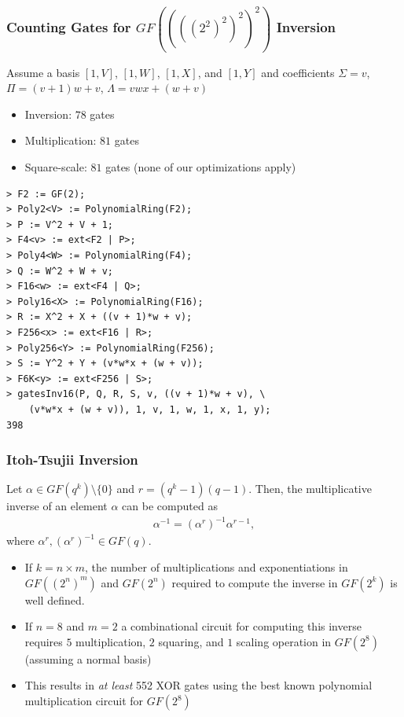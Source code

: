 \documentclass[handout,10pt]{beamer}
\begin{document}
\begin{frame}[fragile]
	\frametitle{Counting Gates for $GF((((2^2)^2)^2)^2)$ Inversion}
	Assume a basis $[1, V]$, $[1, W]$, $[1, X]$, and $[1, Y]$ and coefficients $\Sigma = v$, $\Pi = (v + 1)w + v$, $\Lambda = vwx + (w + v)$
\begin{itemize}
	\item Inversion: $78$ gates
	\item Multiplication: $81$ gates
	\item Square-scale: $81$ gates (none of our optimizations apply)
\end{itemize}

\begin{verbatim}
> F2 := GF(2);
> Poly2<V> := PolynomialRing(F2);
> P := V^2 + V + 1;
> F4<v> := ext<F2 | P>;
> Poly4<W> := PolynomialRing(F4);
> Q := W^2 + W + v;
> F16<w> := ext<F4 | Q>;
> Poly16<X> := PolynomialRing(F16);
> R := X^2 + X + ((v + 1)*w + v);
> F256<x> := ext<F16 | R>;
> Poly256<Y> := PolynomialRing(F256);
> S := Y^2 + Y + (v*w*x + (w + v));
> F6K<y> := ext<F256 | S>;
> gatesInv16(P, Q, R, S, v, ((v + 1)*w + v), \
	(v*w*x + (w + v)), 1, v, 1, w, 1, x, 1, y);
398
\end{verbatim}

\end{frame}

\begin{frame}
	\frametitle{Itoh-Tsujii Inversion}
\begin{theorem}
Let $\alpha \in GF(q^k) \setminus \{0\}$ and $r = (q^k - 1)(q - 1)$. Then, the multiplicative inverse of an element $\alpha$ can be computed as
\begin{align*}
\alpha^{-1} = (\alpha^r)^{-1}\alpha^{r-1},
\end{align*}
where $\alpha^r, (\alpha^r)^{-1} \in GF(q)$.
\end{theorem}

\begin{itemize}
	\pause
	\item If $k = n \times m$, the number of multiplications and exponentiations in $GF((2^n)^m)$ and $GF(2^n)$ required to compute the inverse in $GF(2^k)$ is well defined.
	\pause
	\item If $n = 8$ and $m = 2$ a combinational circuit for computing this inverse requires $5$ multiplication, $2$ squaring, and $1$ scaling operation in $GF(2^8)$ (assuming a normal basis)
	\pause
	\item This results in \emph{at least} 552 XOR gates using the best known polynomial multiplication circuit for $GF(2^8)$
\end{itemize}

\end{frame}
\end{document}
